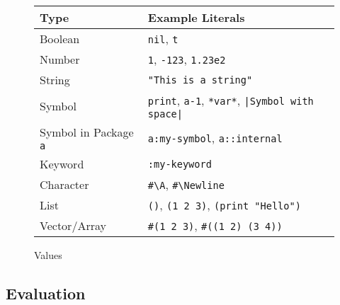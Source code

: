 \documentclass[a4paper]{amsart}
\begin{document}
\begin{figure}[tp]
  \centering
  \begin{tabular}{|l|l|}
    \hline
    Type& Example Literals\\
    \hline\hline
    Boolean & \texttt{nil}, \texttt{t}\\
    \hline
    Number & \texttt{1}, \texttt{-123}, \texttt{1.23e2}\\
    \hline
    String & \verb|"This is a string"|\\
    \hline
    Symbol & \verb|print|, \verb|a-1|, \verb|*var*|, \verb=|Symbol with space|=\\
    \hline
    Symbol in Package \texttt{a} & \verb|a:my-symbol|, \verb|a::internal|\\
    \hline
    Keyword & \verb|:my-keyword|\\
    \hline
    Character & \verb|#\A|, \verb|#\Newline|\\
    \hline
    List & \verb|()|, \verb|(1 2 3)|, \verb|(print "Hello")|\\
    \hline
    Vector/Array & \verb|#(1 2 3)|, \verb|#((1 2) (3 4))|\\
    \hline
  \end{tabular}
  \caption{Values}
  \label{fig:value-literals}
\end{figure}

\subsection{Evaluation}
\label{sec:evaluation}
\end{document}
